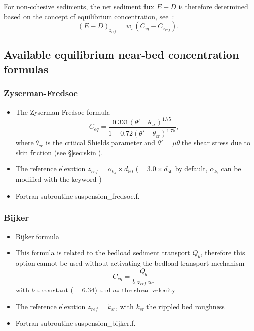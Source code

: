 For non-cohesive sediments, the net sediment flux $E-D$ is therefore determined based on the concept of equilibrium concentration, see~\cite{CelikRodi}:
\begin{equation}\label{eq:CelikRodi}
\left(E-D \right)_{z_{ref}} = w_s \left(C_{eq} - C_{z_{ref}}\right).
\end{equation}

\subsection{Available equilibrium near-bed concentration formulas}\label{sec:concform}
\subsubsection{Zyserman-Fredsoe}
\begin{itemize}
\item The Zyserman-Fredsoe formula~\cite{Zyserman} 
\begin{equation*}
C_{eq} =\frac{0.331(\theta'-\theta_{cr})^{1.75}}{1+0.72(\theta'-\theta_{cr})^{1.75}},
\end{equation*}
where $\theta_{cr}$ is the critical Shields parameter and $\theta'= \mu\theta$ the shear stress due to skin friction (see \S\ref{sec:skin}).
\item The reference elevation $z_{ref}=\alpha_{k_s}\times d_{50}$ ($=3.0\times d_{50}$ by default, $\alpha_{k_s}$ can be modified with the keyword )
\item Fortran subroutine {\ttfamily suspension\_fredsoe.f}.
\end{itemize}

\subsubsection{Bijker}
\begin{itemize}
\item Bijker formula 
\item This formula is related to the bedload sediment transport $Q_b$, therefore this option cannot be used without activating the bedload transport mechanism 
\begin{equation*}
C_{eq} =\frac{Q_b}{b\,z_{ref}\,u_*}
\end{equation*}
with $b$ a constant ($=6.34$) and $u_*$ the shear velocity
\item The reference elevation $z_{ref}=k_{sr}$, with $k_{sr}$ the rippled bed roughness
\item Fortran subroutine {\ttfamily suspension\_bijker.f}.
\end{itemize}

